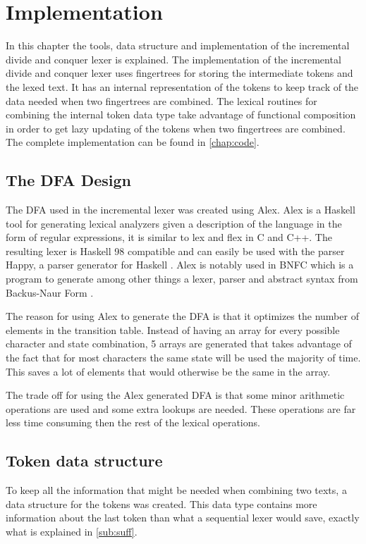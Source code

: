 \chapter{Implementation}\label{chap:imp}
In this chapter the tools, data structure and implementation of the incremental
divide and conquer lexer is explained. The implementation of the incremental
divide and conquer lexer uses fingertrees for storing the intermediate tokens
and the lexed text. It has an internal representation of the tokens to keep
track of the data needed when two fingertrees are combined. The lexical routines
for combining the internal token data type take advantage of functional
composition in order to get lazy updating of the tokens when two fingertrees are
combined. The complete implementation can be found in \cref{chap:code}.

\section{The DFA Design}
The DFA used in the incremental lexer was created using Alex. Alex is a Haskell
tool for generating lexical analyzers given a
description of the language in the form of regular expressions, it is similar to
lex and flex in C and C++. The resulting lexer is Haskell 98 compatible and can
easily be used with the parser Happy, a parser generator for Haskell \cite{alex}.
Alex is notably used in BNFC which is a program to generate among other things a
lexer, parser and abstract syntax from Backus-Naur Form \cite{bnfc}.

The reason for using Alex to generate the DFA is that it optimizes the number of
elements in the transition table. Instead of
having an array for every possible character and state combination, 5 arrays are
generated that takes advantage of the fact that for most characters the same
state will be used the majority of time. This saves a lot of elements that
would otherwise be the same in the array.

The trade off for using the Alex generated DFA is that some minor arithmetic
operations are used and some extra lookups are needed. These operations
are far less time consuming then the rest of the lexical operations.

\section{Token data structure}
To keep all the information that might be needed when combining two texts, a data
structure for the tokens was created. This data type contains more information
about the last token than what a sequential lexer would save, exactly what is
explained in \cref{sub:suff}.

